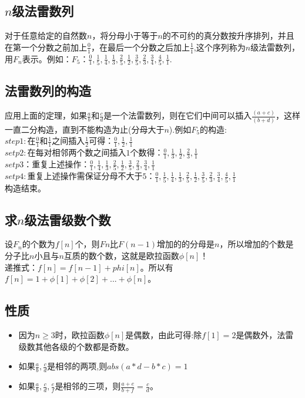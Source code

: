 \subsection{$n$级法雷数列}
对于任意给定的自然数$n$，将分母小于等于$n$的不可约的真分数按升序排列，并且在第一个分数之前加上$\frac{0}{1}$，在最后一个分数之后加上$\frac{1}{1}$,这个序列称为$n$级法雷数列，用$F_n$表示。例如：$F_5：\frac{0}{1}, \frac{1}{5}, \frac{1}{4}, \frac{1}{3}, \frac{2}{5}, \frac{1}{2}, \frac{3}{5}, \frac{2}{3}, \frac{3}{4}, \frac{4}{5}, \frac{1}{1}$.

\subsection{法雷数列的构造}

应用上面的定理，如果$\frac{a}{b}和\frac{c}{d}$是一个法雷数列，则在它们中间可以插入$\frac{(a+c)}{(b+d)}$，这样一直二分构造，直到不能构造为止(分母大于$n$).例如$F_5$的构造: \\
$step1: $在$\frac{0}{1}$和$\frac{1}{1}$之间插入$\frac{1}{2}$可得：$ \frac{0}{1}, \frac{1}{2},\frac{1}{1}$ \\
$setp2: $在每对相邻两个数之间插入$1$个数得：$\frac{0}{1}, \frac{1}{3}, \frac{1}{2}, \frac{2}{3}, \frac{1}{1}$ \\
$setp3：$重复上述操作$：\frac{0}{1}, \frac{1}{4}, \frac{1}{3}, \frac{2}{5}, \frac{1}{2}, \frac{3}{5}, \frac{2}{3}, \frac{3}{4}, \frac{1}{1}$ \\
$setp4: $重复上述操作需保证分母不大于$5：\frac{0}{1}, \frac{1}{5}, \frac{1}{4}, \frac{1}{3}, \frac{2}{5}, \frac{1}{2}, \frac{3}{5}, \frac{2}{3}, \frac{3}{4}, \frac{4}{5}, \frac{1}{1}$ \\
构造结束。
\subsection{求$n$级法雷级数个数}
设$F_n$的个数为$f[n]$个，则$Fn$比$F(n-1)$增加的的分母是$n$，所以增加的个数是分子比$n$小且与$n$互质的数个数，这就是欧拉函数$\phi[n]$！ \\
递推式：$f[n] = f[n - 1] + phi[n]$。所以有$f[n] = 1 + \phi[1] + \phi[2] + ... + \phi[n]$。
\subsection{性质}
\begin{itemize}
\item 因为$n \geq 3$时，欧拉函数$\phi[n]$是偶数，由此可得:除$f[1] = 2$是偶数外，法雷级数其他各级的个数都是奇数。
\item 如果$\frac{a}{b},\frac{c}{d}$是相邻的两项,则$abs(a * d - b * c) = 1$
\item 如果$\frac{a}{b}, \frac{c}{d}, \frac{e}{f}$是相邻的三项，则$\frac{a + e}{b + f} = \frac{c}{d}$。
\end{itemize}

